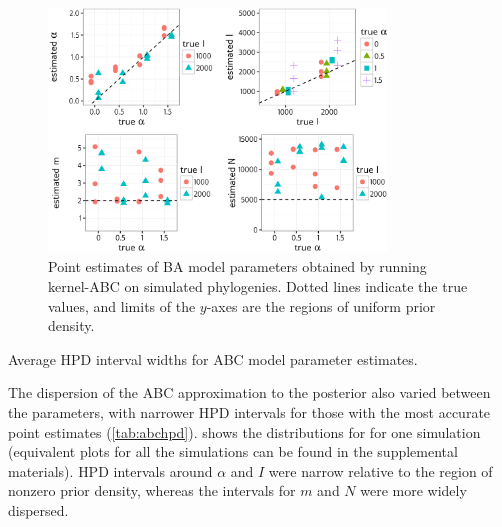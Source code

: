 \documentclass[12pt]{article}\usepackage[]{graphicx}\usepackage[]{color}
\newcommand{\tablepath}{../tables}
\def\figwidth{0.8\textwidth}
\begin{document}
\begin{figure}[ht]
  \centering
  \includegraphics[width=\figwidth]{abc-point-estimate}
  \caption{
    Point estimates of \gls{BA} model parameters obtained by running kernel-ABC
    on simulated phylogenies. Dotted lines indicate the true values, and limits
    of the $y$-axes are the regions of uniform prior density.
  }
  \label{fig:abcpt}
\end{figure}

\begin{table}[ht]
  \centering
  
  \caption{Average \gls{HPD} interval widths for \gls{ABC} model parameter
           estimates.}
  \label{tab:abchpd}
\end{table}

The dispersion of the \gls{ABC} approximation to the posterior also varied
between the parameters, with narrower \gls{HPD} intervals for those with the
most accurate point estimates (\cref{tab:abchpd}).  shows the
distributions for for one simulation (equivalent plots for all the simulations
can be found in the supplemental materials). \gls{HPD} intervals around
$\alpha$ and $I$ were narrow relative to the region of nonzero prior density,
whereas the intervals for $m$ and $N$ were more widely dispersed.
\end{document}
